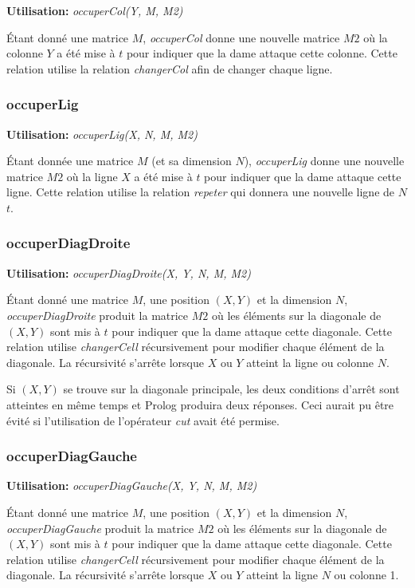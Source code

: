 \documentclass[10pt]{article}
\newcommand{\usage}[1]{\textbf{Utilisation: }\emph{#1}}
\begin{document}
\usage{occuperCol(Y, M, M2)}

Étant donné une matrice $M$, \emph{occuperCol} donne une nouvelle
matrice $M2$ où la colonne $Y$ a été mise à $t$ pour indiquer que la
dame attaque cette colonne. Cette relation utilise la relation
\emph{changerCol} afin de changer chaque ligne.


\subsubsection{occuperLig}

\usage{occuperLig(X, N, M, M2)}

Étant donnée une matrice $M$ (et sa dimension $N$), \emph{occuperLig}
donne une nouvelle matrice $M2$ où la ligne $X$ a été mise à $t$ pour
indiquer que la dame attaque cette ligne. Cette relation utilise la
relation \emph{repeter} qui donnera une nouvelle ligne de $N$ $t$.


\subsubsection{occuperDiagDroite}

\usage{occuperDiagDroite(X, Y, N, M, M2)}

Étant donné une matrice $M$, une position $(X,Y)$ et la dimension $N$,
\emph{occuperDiagDroite} produit la matrice $M2$ où les éléments sur
la diagonale de $(X,Y)$ sont mis à $t$ pour indiquer que la dame
attaque cette diagonale. Cette relation utilise \emph{changerCell}
récursivement pour modifier chaque élément de la diagonale. La
récursivité s'arrête lorsque $X$ ou $Y$ atteint la ligne ou colonne
$N$.

Si $(X,Y)$ se trouve sur la diagonale principale, les deux conditions
d'arrêt sont atteintes en même temps et Prolog produira deux réponses.
Ceci aurait pu être évité si l'utilisation de l'opérateur \emph{cut}
avait été permise.


\subsubsection{occuperDiagGauche}

\usage{occuperDiagGauche(X, Y, N, M, M2)}

Étant donné une matrice $M$, une position $(X,Y)$ et la dimension $N$,
\emph{occuperDiagGauche} produit la matrice $M2$ où les éléments sur
la diagonale de $(X,Y)$ sont mis à $t$ pour indiquer que la dame
attaque cette diagonale. Cette relation utilise \emph{changerCell}
récursivement pour modifier chaque élément de la diagonale. La
récursivité s'arrête lorsque $X$ ou $Y$ atteint la ligne $N$ ou
colonne 1.
\end{document}
